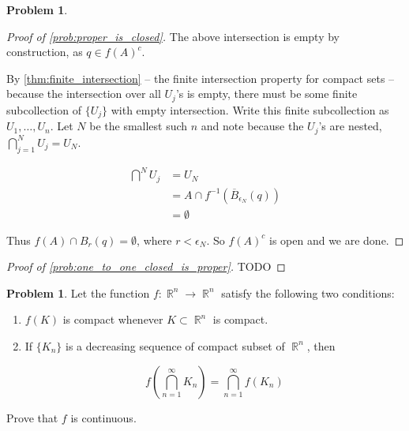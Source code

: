 \documentclass[english]{article}
\DeclareMathOperator{\R}{\mathbb{R}}
\newcommand{\inv}[1]{#1^{-1}}
\theoremstyle{definition}
\newtheorem{problem}[theorem]{Problem}
\begin{document}
\begin{problem}
\begin{proof}[Proof of \cref{prob:proper_is_closed}]
            The above intersection is empty by construction, as $q \in f(A)^c$.
            
            By \cref{thm:finite_intersection} -- the finite intersection property for compact sets -- because the intersection over all $U_j$'s is empty, there must be some finite subcollection of $\{U_j\}$ with empty intersection. Write this finite subcollection as $U_1, \dots, U_n$. Let $N$  be the smallest such $n$ and note because the $U_j$'s are nested, $\bigcap^N_{j=1} U_j = U_N$. 

            \begin{align*}
                \bigcap^N U_j
                & = U_N \\
                & = A \cap \inv{f}\left( \overline{B}_{\epsilon_N}(q) \right) \\
                & = \emptyset
            \end{align*}

            Thus $f(A) \cap B_{r}(q) = \emptyset$, where $r < \epsilon_N$. So $f(A)^c$ is open and we are done. 
    \end{proof}
    
    \begin{proof}[Proof of \cref{prob:one_to_one_closed_is_proper}]
        TODO
    \end{proof}
\end{problem}

\begin{problem}
    \label{prob:function_of_intersections}
    Let the function $f: \R^n \to \R^n$ satisfy the following two conditions:
    
    \begin{enumerate}
        \item \label{enum:prob:function_of_intersections_1} $f(K)$ is compact whenever $K \subset \R^n$ is compact.
        \item \label{enum:prob:function_of_intersections_2} If $\{K_n\}$ is a decreasing sequence of compact subset of $\R^n$, then 
        
        \[
            f\left(\bigcap_{n = 1}^{\infty} K_n \right) = \bigcap_{n = 1}^{\infty} f(K_n)
        \]
    \end{enumerate}

    Prove that $f$ is continuous.
\end{problem}
\end{document}
